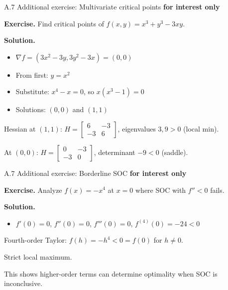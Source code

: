 \documentclass[11pt,aspectratio=169]{beamer}
\newcommand{\InterestOnly}{\textcolor{mAccent}{\textbf{for interest only}}}
\begin{document}
\hypertarget{appendix:exercises}{}
\begin{frame}{A.7 Additional exercise: Multivariate critical points}
  \small
  \InterestOnly
  
  \textbf{Exercise.} Find critical points of $f(x,y) = x^3 + y^3 - 3xy$.
  
  \textbf{Solution.}
  
  \begin{itemize}
    \item $\nabla f = (3x^2 - 3y, 3y^2 - 3x) = (0,0)$
    
    \item From first: $y = x^2$
    
    \item Substitute: $x^4 - x = 0$, so $x(x^3 - 1) = 0$
    
    \item Solutions: $(0,0)$ and $(1,1)$
  \end{itemize}
  
  Hessian at $(1,1)$: $H = \begin{bmatrix} 6 & -3 \\ -3 & 6 \end{bmatrix}$, eigenvalues $3, 9 > 0$ (local min).
  
  At $(0,0)$: $H = \begin{bmatrix} 0 & -3 \\ -3 & 0 \end{bmatrix}$, determinant $-9 < 0$ (saddle).
\end{frame}

\begin{frame}{A.7 Additional exercise: Borderline SOC}
  \small
  \InterestOnly
  
  \textbf{Exercise.} Analyze $f(x) = -x^4$ at $x=0$ where SOC with $f'' < 0$ fails.
  
  \textbf{Solution.}
  
  \begin{itemize}
    \item $f'(0) = 0$, $f''(0) = 0$, $f'''(0) = 0$, $f^{(4)}(0) = -24 < 0$
  \end{itemize}
  
  Fourth-order Taylor: $f(h) = -h^4 < 0 = f(0)$ for $h \neq 0$.
  
  Strict local maximum.
  
  This shows higher-order terms can determine optimality when SOC is inconclusive.
\end{frame}
\end{document}
